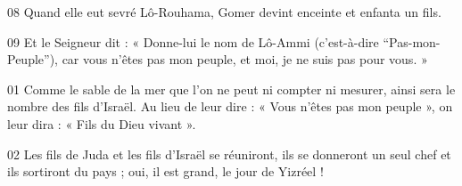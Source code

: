 
08 Quand elle eut sevré Lô-Rouhama, Gomer devint enceinte et enfanta un fils.

09 Et le Seigneur dit : « Donne-lui le nom de Lô-Ammi (c’est-à-dire “Pas-mon-Peuple”), car vous n’êtes pas mon peuple, et moi, je ne suis pas pour vous. »

01 Comme le sable de la mer que l’on ne peut ni compter ni mesurer, ainsi sera le nombre des fils d’Israël. Au lieu de leur dire : « Vous n’êtes pas mon peuple », on leur dira : « Fils du Dieu vivant ».

02 Les fils de Juda et les fils d’Israël se réuniront, ils se donneront un seul chef et ils sortiront du pays ; oui, il est grand, le jour de Yizréel !

